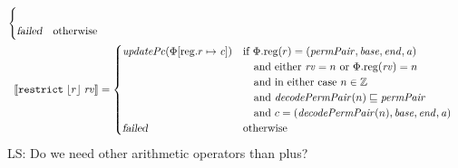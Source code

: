 \documentclass[a4paper]{article}
\newcommand{\update}[2]{[#1 \mapsto #2]}
\newcommand{\sem}[1]{\left\llbracket #1 \right\rrbracket}
\newcommand\lau[1]{{\color{purple} \sf \footnotesize {LS: #1}}\\}
\newcommand{\var}[1]{\mathit{#1}}
\newcommand{\rv}{\var{rv}}
\newcommand{\gl}{\var{g}}
\newcommand{\addr}{\var{a}}
\newcommand{\start}{\var{base}}
\newcommand{\addrend}{\var{end}}
\newcommand{\perm}{\var{perm}}
\newcommand{\permp}{\var{permPair}}
\newcommand{\stdcap}[1][(\perm,\gl)]{\left(#1,\start,\addrend,\addr \right)}
\newcommand{\plainproj}[1]{\mathrm{#1}}
\newcommand{\memreg}[1][\Phi]{#1.\plainproj{reg}}
\newcommand{\updateReg}[3][\Phi]{#1\update{\plainproj{reg}.#2}{#3}}
\newcommand{\failed}{\textsl{failed}}
\newcommand{\plainfun}[2]{
  \ifthenelse{\equal{#2}{}}
  {\mathit{#1}}
  {\mathit{#1}(#2)}
}
\newcommand{\decodePermPair}{\plainfun{decodePermPair}}
\newcommand{\stdUpdatePc}[1]{\plainfun{updatePc}{#1}}
\newcommand{\ints}{\mathbb{Z}}
\newcommand{\refreg}[1]{\lfloor #1 \rfloor}
\newcommand{\zinstr}[1]{\mathtt{#1}}
\newcommand{\twoinstr}[3]{\zinstr{#1} \; #2 \; #3}
\newcommand{\restricttwo}[2]{\twoinstr{restrict}{#1}{#2}}
\begin{document}
\begin{align*}
\begin{cases}
\begin{array}[t]{l}
                                               \end{array}\\
                                               \failed               & \text{otherwise}
                                             \end{cases} 
  \\
  \sem{\restricttwo{\refreg{r}}{\rv}}           & =
                                                  \begin{cases}
                                                    \stdUpdatePc{\updateReg{r}{\var{c}}}  &
                                                    \arraycolsep=0pt
                                                    \begin{array}[t]{l}
                                                      \text{if $\memreg(r) = \stdcap[\permp]$}\\
                                                      \quad\text{and either $\rv = n$ or $\memreg(\rv) = n$}\\
                                                      \quad\text{and in either case $n \in \ints$}\\
                                                      \quad\text{and $\decodePermPair{n}\sqsubseteq \permp$}\\
                                                      \quad\text{and $c = (\decodePermPair{n},\start,\addrend,\addr)$}
                                                    \end{array}\\
                                                    \failed                   & \text{otherwise}
                                                  \end{cases} 
\end{align*}
\lau{Do we need other arithmetic operators than plus?}
\end{document}
